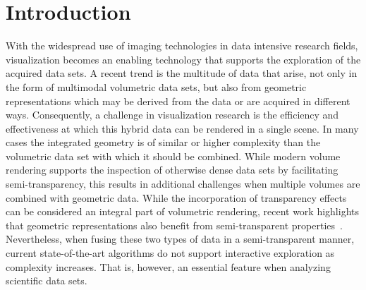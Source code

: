 \documentclass{egpubl}
\newcommand{\todo}[1]{{\color{red}\emph{(#1)}}}
\newcommand{\remark}[1]{{\color{blue!80!white}\textbf{Remark:} #1}}
\newcommand{\ab}{\mbox{A-buffer}}
\begin{document}
\section{Introduction}
\label{sec:introduction}


With the widespread use of imaging technologies in data intensive research fields, visualization becomes an enabling technology that supports the exploration of the acquired data sets. 
A recent trend is the multitude of data that arise, not only in the form of multimodal volumetric data sets, but also from geometric representations which may be derived from the data or are acquired in different ways.
Consequently, a challenge in visualization research is the efficiency and effectiveness at which this hybrid data can be rendered in a single scene. 
In many cases the integrated geometry is of similar or higher complexity than the volumetric data set with which it should be combined. 
While modern volume rendering supports the inspection of otherwise dense data sets by facilitating semi-transparency, this results in additional challenges when multiple volumes are combined with geometric data. 
While the incorporation of transparency effects can be considered an integral part of volumetric rendering, recent work highlights that geometric representations also benefit from semi-transparent properties~\cite{Guenther:2013:TOG}. 
Nevertheless, when fusing these two types of data in a semi-transparent manner, current state-of-the-art algorithms do not support interactive exploration as complexity increases.
That is, however, an essential feature when analyzing scientific data sets.
\end{document}
